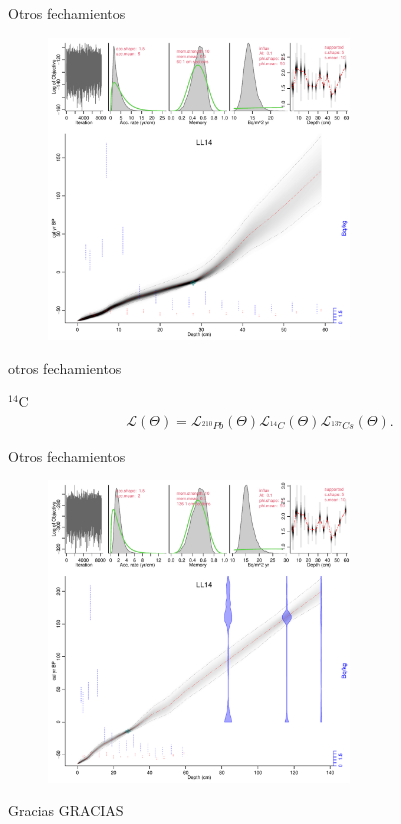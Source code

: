 \documentclass{beamer}
\begin{document}
\begin{frame}{Otros fechamientos}
	\begin{figure}
		\begin{centering}
			\includegraphics[width=8cm]{./Figures/LL14_60.pdf}
			\caption{}
			\label{}
		\end{centering}
	\end{figure}
\end{frame} 


\begin{frame}{otros fechamientos}
	\begin{block}{$^{14}$C }
		\begin{eqnarray}
			\mathcal{L}\left(\Theta\right) = \mathcal{L}_{^{210}Pb}\left(\Theta\right)\mathcal{L}_{^{14}C}\left(\Theta\right) \mathcal{L}_{^{137}Cs}\left(\Theta\right).
		\end{eqnarray}
	\end{block} 
\end{frame} 

\begin{frame}{Otros fechamientos }
	\begin{figure}
		\begin{centering}
			\includegraphics[width=8cm]{./Figures/LL14_136.pdf}
			\caption{}
			\label{}
		\end{centering}
	\end{figure}
\end{frame} 


\begin{frame}{Gracias}
	GRACIAS
\end{frame} 
\end{document}
